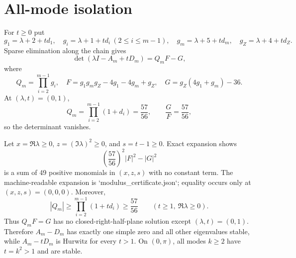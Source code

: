 \section*{All-mode isolation}
For $t\ge0$ put
\[
g_1=\lambda+2+td_1,
\quad g_i=\lambda+1+td_i\ (2\le i\le m-1),
\quad g_m=\lambda+5+td_m,
\quad g_Z=\lambda+4+td_Z.
\]
Sparse elimination along the chain gives
\[
\det(\lambda I-A_m+tD_m)=Q_mF-G,
\]
where
\[
Q_m=\prod_{i=2}^{m-1}g_i,
\quad
F=g_1g_mg_Z-4g_1-4g_m+g_Z,
\quad
G=g_Z(4g_1+g_m)-36.
\]
At $(\lambda,t)=(0,1)$,
\[
Q_m=\prod_{i=2}^{m-1}(1+d_i)=\frac{57}{56},
\qquad
\frac{G}{F}=\frac{57}{56},
\]
so the determinant vanishes.

Let $x=\Re\lambda\ge0$, $z=(\Im\lambda)^2\ge0$, and $s=t-1\ge0$.  Exact
expansion shows
\[
\left(\frac{57}{56}\right)^2|F|^2-|G|^2
\]
is a sum of 49 positive monomials in $(x,z,s)$ with no constant term.  The
machine-readable expansion is `modulus_certificate.json`; equality occurs
only at $(x,z,s)=(0,0,0)$.  Moreover,
\[
|Q_m|\ge\prod_{i=2}^{m-1}(1+td_i)\ge\frac{57}{56}
\qquad(t\ge1,\ \Re\lambda\ge0).
\]
Thus $Q_mF=G$ has no closed-right-half-plane solution except
$(\lambda,t)=(0,1)$.  Therefore $A_m-D_m$ has exactly one simple zero and all
other eigenvalues stable, while $A_m-tD_m$ is Hurwitz for every $t>1$.
On $(0,\pi)$, all modes $k\ge2$ have $t=k^2>1$ and are stable.
